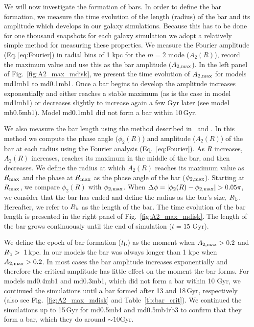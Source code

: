We will now investigate the formation of bars.  In order to define the
bar formation, we measure the time evolution of the length (radius) of the bar
and its amplitude which develops in our galaxy simulations. Because
this has to be done for one thousand snapshots for each galaxy
simulation we adopt a relatively simple method for measuring these
properties.  We measure the Fourier amplitude (Eq.\,\ref{eq:Fourier})
in radial bins of 1 kpc for the $m=2$ mode ($A_2(R)$), record the maximum
value and use this as the bar amplitude ($A_{\rm 2, max}$).  In the
left panel of Fig.~\ref{fig:A2_max_mdisk}, we present the time
evolution of $A_{\rm 2, max}$ for models md1mb1 to md0.1mb1.  Once a
bar begins to develop the amplitude increases exponentially and either
reaches a stable maximum (as is the case in model md1mb1) or decreases
slightly to increase again a few Gyr later (see model mb0.5mb1). Model
md0.1mb1 did not form a bar within 10\,Gyr.  

We also measure the bar
length using the method described in~\citet{2012MNRAS.425L..10S}
and \citet{2015PASJ...67...63O}. In this method we compute the phase angle
($\phi_{2}(R)$) and amplitude ($A_{2}(R)$) of the bar at each radius
using the Fourier analysis (Eq.~\ref{eq:Fourier}). 
As $R$ increases, $A_{2}(R)$ increases, reaches its maximum in the middle
of the bar, and then decreases. 
We define the radius at which $A_{2}(R)$ reaches its maximum value
as $R_{\rm max}$ and the phase at $R_{\rm max}$ as the phase 
angle of the bar ($\phi_{\rm 2, max}$). Starting at $R_{\rm max}$,
we compare $\phi_{2}(R)$ with $\phi_{\rm 2, max}$. 
When $\Delta \phi=|\phi_{2}(R)-\phi_{\rm 2, max}|>0.05\pi$, we consider 
that the bar has ended and define the radius as the bar's size, $R_{\rm b}$.
Hereafter, we refer to $R_{\rm b}$ as the length of the bar. The time evolution of
the bar length is presented in the right panel of
Fig.~\ref{fig:A2_max_mdisk}. The length of the bar grows continuously
until the end of simulation ($t=15$ Gyr).

We define the epoch of bar formation ($t_{\rm b}$) as the moment 
when $A_{\rm 2, max} > 0.2$ and $R_{\rm b} > $~1\,kpc. In our models the bar was always longer 
than 1 kpc when  $A_{\rm 2, max}>0.2$. 
In most cases the bar amplitude increases exponentially and therefore the critical 
amplitude has little effect on the moment the bar forms.
For models md0.4mb1 and md0.3mb1, which did not form a bar within 10 Gyr, we continued
the simulations until a bar formed after 13 and 18\,Gyr, respectively
(also see Fig.~\ref{fig:A2_max_mdisk} and Table~\ref{tb:bar_crit}).
We continued the simulations up to 15\,Gyr for md0.5mb4 and md0.5mb4rb3 
to confirm that they form a bar, which they do around  $\sim 10$Gyr.
 
